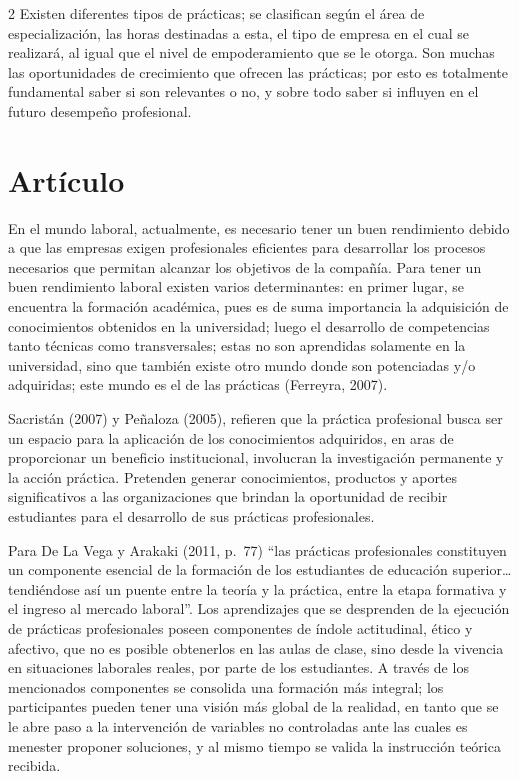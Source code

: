 \documentclass[12pt,spanish,Letterpaper,openany]{book}
\begin{document}
\begin {multicols}{2}
Existen diferentes tipos de prácticas; se clasifican según el área de especialización, las horas destinadas a esta, el tipo de empresa en el cual se realizará, al igual que el nivel de empoderamiento que se le otorga. Son muchas las oportunidades de crecimiento que ofrecen las prácticas; por esto es totalmente fundamental saber si son relevantes o no, y sobre todo saber si influyen en el futuro desempeño profesional.

\hypertarget{artuxedculo-9}{%
\section{Artículo}\label{artuxedculo-9}}

En el mundo laboral, actualmente, es necesario tener un buen rendimiento debido a que las empresas exigen profesionales eficientes para desarrollar los procesos necesarios que permitan alcanzar los objetivos de la compañía. Para tener un buen rendimiento laboral existen varios determinantes: en primer lugar, se encuentra la formación académica, pues es de suma importancia la adquisición de conocimientos obtenidos en la universidad; luego el desarrollo de competencias tanto técnicas como transversales; estas no son aprendidas solamente en la universidad, sino que también existe otro mundo donde son potenciadas y/o adquiridas; este mundo es el de las prácticas (Ferreyra, 2007).

Sacristán (2007) y Peñaloza (2005), refieren que la práctica profesional busca ser un espacio para la aplicación de los conocimientos adquiridos, en aras de proporcionar un beneficio institucional, involucran la investigación permanente y la acción práctica. Pretenden generar conocimientos, productos y aportes significativos a las organizaciones que brindan la oportunidad de recibir estudiantes para el desarrollo de sus prácticas profesionales.

Para De La Vega y Arakaki (2011, p.~77) ``las prácticas profesionales constituyen un componente esencial de la formación de los estudiantes de educación superior\ldots{} tendiéndose así un puente entre la teoría y la práctica, entre la etapa formativa y el ingreso al mercado laboral''. Los aprendizajes que se desprenden de la ejecución de prácticas profesionales poseen componentes de índole actitudinal, ético y afectivo, que no es posible obtenerlos en las aulas de clase, sino desde la vivencia en situaciones laborales reales, por parte de los estudiantes. A través de los mencionados componentes se consolida una formación más integral; los participantes pueden tener una visión más global de la realidad, en tanto que se le abre paso a la intervención de variables no controladas ante las cuales es menester proponer soluciones, y al mismo tiempo se valida la instrucción teórica recibida.


\end{multicols}
\end{document}
